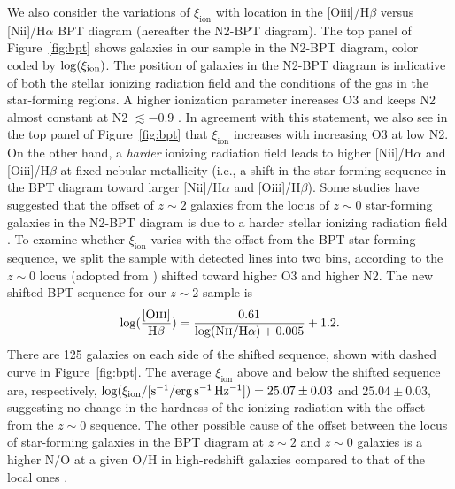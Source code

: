 \documentclass[iop]{emulateapj}
\newcommand{\xiion}{\ensuremath{\xi_{\mathrm{ion}}}}
\newcommand{\halpha}{H\ensuremath{\alpha}}
\newcommand{\hbeta}{H\ensuremath{\beta}}
\begin{document}
We also consider the variations of {\xiion} with location in the [O{\sc iii}]/{\hbeta} versus [N{\sc ii}]/{\halpha} BPT diagram (hereafter the N2-BPT diagram). The top panel of Figure~\ref{fig:bpt} shows galaxies in our sample in the N2-BPT diagram, color coded by $\log(\xi_{\rm ion})$.
The position of galaxies in the N2-BPT diagram is indicative of both the stellar ionizing radiation field and the conditions of the gas in the star-forming regions. A higher ionization parameter increases O3 and keeps N2 almost constant at N2 $\lesssim -0.9$ \citep[low metallicity;][]{kewley13}. In agreement with this statement, we also see in the top panel of Figure~\ref{fig:bpt} that {\xiion} increases with increasing O3 at low N2.
On the other hand, a {\em harder} ionizing radiation field leads to higher [N{\sc ii}]/{\halpha} and [O{\sc iii}]/{\hbeta} at fixed nebular metallicity (i.e., a shift in the star-forming sequence in the BPT diagram toward larger [N{\sc ii}]/{\halpha} and [O{\sc iii}]/{\hbeta}). Some studies have suggested that the offset of $z\sim 2$ galaxies from the locus of $z\sim 0$ star-forming galaxies in the N2-BPT diagram is due to a harder stellar ionizing radiation field \citep{steidel14,steidel16,strom17}.
To examine whether {\xiion} varies with the offset from the BPT star-forming sequence, we split the sample with detected lines into two bins, according to the $z\sim 0$ locus (adopted from \citealt{kewley13}) shifted toward higher O3 and higher N2. The new shifted BPT sequence for our $z\sim 2$ sample is
\begin{equation}
\log(\frac{\rm [O{\normalfont\textsc{iii}}]}{\rm H\beta}) = \frac{0.61}{\log({\rm N{\normalfont\textsc{ii}}/H\alpha})+0.005} + 1.2.
\end{equation}
There are 125 galaxies on each side of the shifted sequence, shown with dashed curve in Figure~\ref{fig:bpt}. The average {\xiion} above and below the shifted sequence are, respectively, $\log(\xi_{\rm{ion}}/[{\rm{s^{-1}/erg\,s^{-1}\,Hz^{-1}}}])= 25.07\pm 0.03$ and $25.04\pm 0.03$, suggesting no change in the hardness of the ionizing radiation with the offset from the $z\sim 0$ sequence. The other possible cause of the offset between the locus of star-forming galaxies in the BPT diagram at $z\sim 2$ and $z\sim 0$ galaxies is a higher N$/$O at a given O$/$H in high-redshift galaxies compared to that of the local ones \citep[for detailed discussions see][]{shapley15,masters16,cowie16,sanders16a}.
\end{document}
